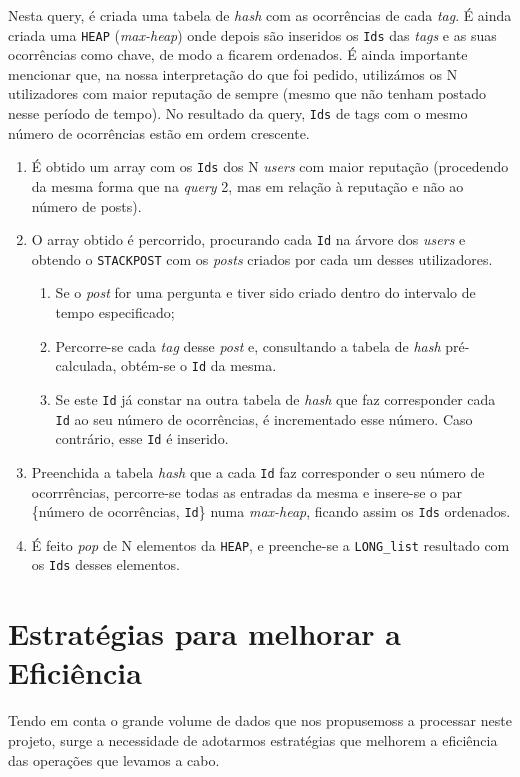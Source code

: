 \documentclass[10pt]{article}
\begin{document}
			Nesta query, é criada uma tabela de \textit{hash} com as ocorrências de cada
		\textit{tag}. É ainda criada uma \texttt{HEAP} (\textit{max-heap}) onde depois são inseridos
		os \texttt{Ids} das \textit{tags} e as suas ocorrências como chave, de modo a ficarem 
		ordenados.
			É ainda importante mencionar que, na nossa interpretação do que foi pedido,
		utilizámos os N utilizadores com maior reputação de sempre (mesmo que não tenham
		postado nesse período de tempo). No resultado da query, \texttt{Ids} de tags com
		o mesmo número de ocorrências estão em ordem crescente.		
		
			\begin{enumerate}
				\item É obtido um array com os \texttt{Ids} dos N \textit{users} com
					maior reputação (procedendo da mesma forma que na \textit{query} 2, mas em
					relação à reputação e não ao número de posts).
				\item O array obtido é percorrido, procurando cada \texttt{Id} na árvore dos
					\textit{users} e obtendo  o \texttt{STACKPOST} com os \textit{posts}
					criados por cada um desses utilizadores.
					\begin{enumerate}
						\item Se o \textit{post} for uma pergunta e tiver sido criado dentro
							do intervalo de tempo especificado;
						\item Percorre-se cada \textit{tag} desse \textit{post} e, consultando 
						 a tabela de \textit{hash} pré-calculada, obtém-se o \texttt{Id} da mesma.
						\item Se este \texttt{Id} já constar na outra tabela de \textit{hash} que
							faz corresponder cada \texttt{Id} ao seu número de ocorrências, é 
							incrementado esse número. Caso contrário, esse \texttt{Id} é inserido.
					\end{enumerate}
				\item Preenchida a tabela \textit{hash} que a cada \texttt{Id} faz corresponder
				o seu número de ocorrrências, percorre-se todas as entradas da mesma e insere-se
				o par \{número de ocorrências, \texttt{Id}\} numa \textit{max-heap}, ficando assim
				os \texttt{Ids} ordenados.
				\item É feito \textit{pop} de N elementos da \texttt{HEAP}, e preenche-se a
				\texttt{LONG\_list} resultado com os \texttt{Ids} desses elementos.
			\end{enumerate}
\pagebreak

\section{Estratégias para melhorar a Eficiência}
		Tendo em conta o grande volume de dados que nos propusemoss a processar neste projeto,
	surge a necessidade de adotarmos estratégias que melhorem a eficiência das operações que
	levamos a cabo.
	
\end{document}
